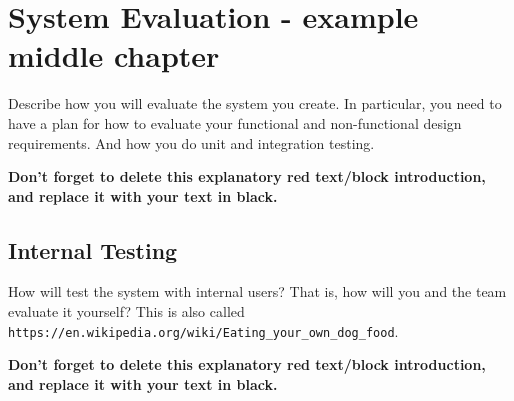 \chapter{System Evaluation - example middle chapter} %

\begin{tcolorbox}[      %
    boxrule=0pt,        %
    colback=white,      %
    coltext=red         %
]                       %
    Describe how you will evaluate the system you create. In particular, you need to have a plan for how to evaluate your functional and non-functional design requirements. And how you do unit and integration testing.
    
    \vspace{15pt}       %
    \begin{center}      %
    \textbf{Don't forget to delete this explanatory red text/block introduction, and replace it with your text in black.}
    \end{center}        %
\end{tcolorbox}         %

\section{Internal Testing} %

\begin{tcolorbox}[      %
    boxrule=0pt,        %
    colback=white,      %
    coltext=red         %
]                       %
    How will test the system with internal users? That is, how will you and the team evaluate it yourself? This is also called \verb$https://en.wikipedia.org/wiki/Eating_your_own_dog_food$.
    
    \vspace{15pt}       %
    \begin{center}      %
    \textbf{Don't forget to delete this explanatory red text/block introduction, and replace it with your text in black.}
    \end{center}        %
\end{tcolorbox}         %

